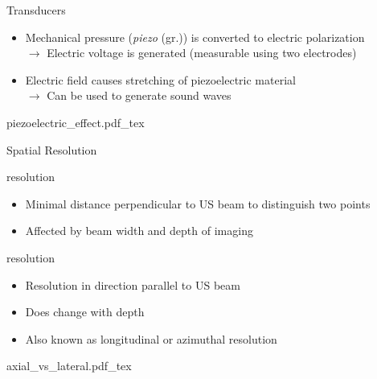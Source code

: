 \begin{frame}{Transducers \cont}

    \begin{itemize}
        \item Mechanical pressure (\emph{piezo} (gr.)) is converted to electric polarization\\
              $\rightarrow$ Electric voltage is generated (measurable using two electrodes)
              \vspace{.2cm}
        \item Electric field causes stretching of piezoelectric material\\
              $\rightarrow$ Can be used to generate sound waves
              \vspace{.2cm}
    \end{itemize}
    \def\svgwidth{.49\linewidth}{piezoelectric_effect.pdf_tex}%
    \begin{figure}
    \end{figure}
\end{frame}


%
%


\begin{frame}{Spatial Resolution}

     resolution
    \begin{itemize}
        \item Minimal distance perpendicular to US beam to distinguish two points
        \item Affected by beam width and depth of imaging
    \end{itemize}

    \vspace{.5cm}
     resolution
    \begin{itemize}
        \item Resolution in direction parallel to US beam
        \item Does  change with depth
        \item Also known as longitudinal or azimuthal resolution
    \end{itemize}

    \vspace{-1cm}
    \flushright
    \def\svgwidth{.49\linewidth}
    {axial_vs_lateral.pdf_tex}

\end{frame}


